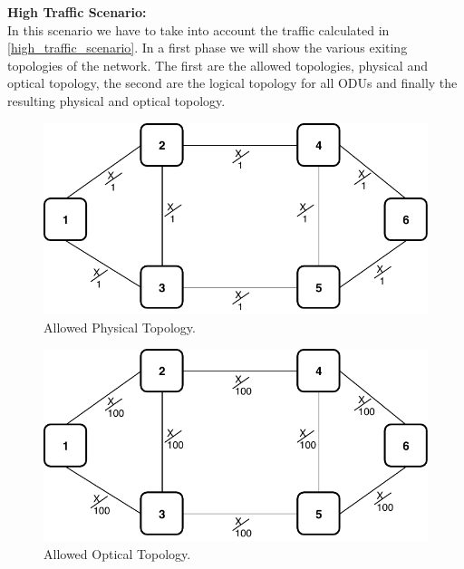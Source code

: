 \vspace{17pt}
\textbf{High Traffic Scenario:}\\

In this scenario we have to take into account the traffic calculated in \ref{high_traffic_scenario}. In a first phase we will show the various exiting topologies of the network. The first are the allowed topologies, physical and optical topology, the second are the logical topology for all ODUs and finally the resulting physical and optical topology.

\begin{figure}[h!]
\centering
\includegraphics[width=12cm]{sdf/ilp/opaque_protection/figures/allowed_physical_topology}
\caption{Allowed Physical Topology.}
\label{allowed_physical_protectionhigh}
\end{figure}

\begin{figure}[h!]
\centering
\includegraphics[width=12cm]{sdf/ilp/opaque_protection/figures/allowed_optical_topology}
\caption{Allowed Optical Topology.}
\label{allowed_optical_protectionhigh}
\end{figure}


